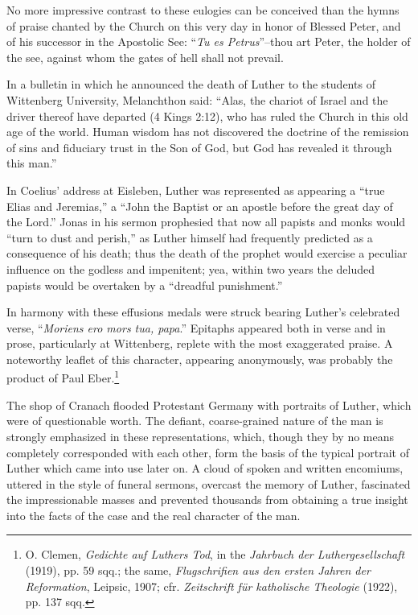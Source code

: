 No more impressive contrast to these eulogies can be conceived than
the hymns of praise chanted by the Church on this very day in honor
of Blessed Peter, and of his successor in the Apostolic See: “\textit{Tu es
Petrus}”--thou art Peter, the holder of the see, against whom the
gates of hell shall not prevail.

In a bulletin in which he announced the death of Luther to the students of
Wittenberg University, Melanchthon said: “Alas, the chariot of Israel and the
driver thereof have departed (4 Kings 2:12), who has ruled the Church in this
old age of the world. Human wisdom has not discovered the doctrine of the
remission of sins and fiduciary trust in the Son of God, but God has revealed
it through this man.”

In Coelius’ address at Eisleben, Luther was represented as appearing
a “true Elias and Jeremias,” a “John the Baptist or an apostle before
the great day of the Lord.” Jonas in his sermon prophesied that now
all papists and monks would “turn to dust and perish,” as Luther himself
had frequently predicted as a consequence of his death; thus the
death of the prophet would exercise a peculiar influence on the godless
and impenitent; yea, within two years the deluded papists would
be overtaken by a “dreadful punishment.”

In harmony with these effusions medals were struck bearing Luther’s celebrated
verse, “\textit{Moriens ero mors tua, papa}.” Epitaphs appeared both in verse and
in prose, particularly at Wittenberg, replete
with the most exaggerated praise. A noteworthy leaflet of this character,
appearing anonymously, was probably the product of Paul
Eber.\footnote
{O. Clemen, \textit{Gedichte auf Luthers Tod}, in the \textit{Jahrbuch der Luthergesellschaft} (1919),
pp. 59 sqq.; the same, \textit{Flugschrifien aus den ersten Jahren der Reformation}, Leipsic, 1907;
cfr. \textit{Zeitschrift für katholische Theologie} (1922), pp. 137 sqq.}

The shop of Cranach flooded Protestant Germany with portraits
of Luther, which were of questionable worth. The defiant,
coarse-grained nature of the man is strongly emphasized in these
representations, which, though they by no means completely corresponded
with each other, form the basis of the typical portrait of Luther
which came into use later on. A cloud of spoken and written encomiums,
uttered in the style of funeral sermons, overcast the memory of Luther,
fascinated the impressionable masses and prevented
thousands from obtaining a true insight into the facts of the case and
the real character of the man.

